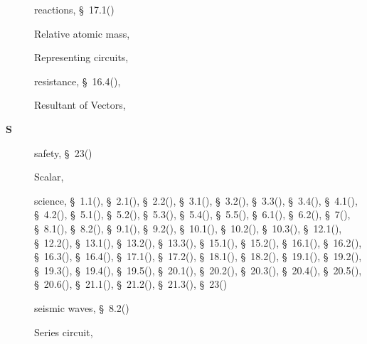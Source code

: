 \begin{multicols}{2}
{\begin{description}
	  \item[] \noindent\raggedright reactions,  \S~17.1(\pageref{m38720})
	  \item[] \noindent\raggedright Relative atomic mass,  \pageref{id2415700}
	  \item[] \noindent\raggedright Representing circuits,  \pageref{id2478537}
	  \item[] \noindent\raggedright resistance,  \S~16.4(\pageref{m38776}),  \pageref{id2485077}
	  \item[] \noindent\raggedright Resultant of Vectors,  \pageref{id2512331}
	  \vspace{.3cm}
	  \item[{\large \bfseries S}]\noindent\raggedright
	  safety,  \S~23(\pageref{m38491})
	  \item[] \noindent\raggedright Scalar,  \pageref{id2510220}
	  \item[] \noindent\raggedright science,  \S~1.1(\pageref{m38708}),  \S~2.1(\pageref{m38736}),  \S~2.2(\pageref{m38734}),  \S~3.1(\pageref{m38756}),  \S~3.2(\pageref{m38745}),  \S~3.3(\pageref{m38753}),  \S~3.4(\pageref{m38741}),  \S~4.1(\pageref{m38760}),  \S~4.2(\pageref{m38757}),  \S~5.1(\pageref{m38704}),  \S~5.2(\pageref{m38701}),  \S~5.3(\pageref{m38684}),  \S~5.4(\pageref{m38694}),  \S~5.5(\pageref{m38689}),  \S~6.1(\pageref{m38801}),  \S~6.2(\pageref{m38802}),  \S~7(\pageref{m38806}),  \S~8.1(\pageref{m38782}),  \S~8.2(\pageref{m38783}),  \S~9.1(\pageref{m38799}),  \S~9.2(\pageref{m38800}),  \S~10.1(\pageref{m38777}),  \S~10.2(\pageref{m38778}),  \S~10.3(\pageref{m38779}),  \S~12.1(\pageref{m38709}),  \S~12.2(\pageref{m38711}),  \S~13.1(\pageref{m38721}),  \S~13.2(\pageref{m38726}),  \S~13.3(\pageref{m38727}),  \S~15.1(\pageref{m38780}),  \S~15.2(\pageref{m38781}),  \S~16.1(\pageref{m38771}),  \S~16.2(\pageref{m38772}),  \S~16.3(\pageref{m38773}),  \S~16.4(\pageref{m38776}),  \S~17.1(\pageref{m38720}),  \S~17.2(\pageref{m38719}),  \S~18.1(\pageref{m38717}),  \S~18.2(\pageref{m38712}),  \S~19.1(\pageref{m38812}),  \S~19.2(\pageref{m38813}),  \S~19.3(\pageref{m38815}),  \S~19.4(\pageref{m38816}),  \S~19.5(\pageref{m38819}),  \S~20.1(\pageref{m38787}),  \S~20.2(\pageref{m38788}),  \S~20.3(\pageref{m38791}),  \S~20.4(\pageref{m38794}),  \S~20.5(\pageref{m38795}),  \S~20.6(\pageref{m38796}),  \S~21.1(\pageref{m38784}),  \S~21.2(\pageref{m38785}),  \S~21.3(\pageref{m38786}),  \S~23(\pageref{m38491})
	  \item[] \noindent\raggedright seismic waves,  \S~8.2(\pageref{m38783})
	  \item[] \noindent\raggedright Series circuit,  \pageref{id2478736}

\end{description}}
\end{multicols}
